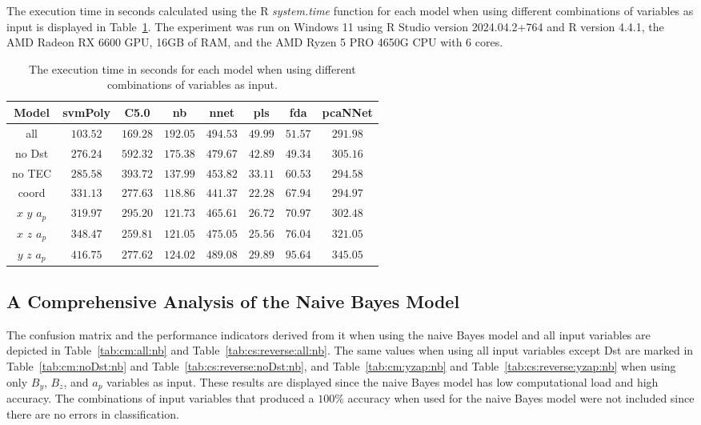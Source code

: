 \documentclass[preprint,12pt]{elsarticle}
\begin{document}
The execution time in seconds calculated using the R \textit{system.time} function \cite{rdocumentationSystemtimeFunction} for each model when using different combinations of variables as input is displayed in Table~\ref{tab:time:total}. The experiment was run on Windows 11 using R Studio version 2024.04.2+764 and R version 4.4.1, the AMD Radeon RX 6600 GPU, 16GB of RAM, and the AMD Ryzen 5 PRO 4650G CPU with 6 cores.

\begin{table}[!ht]
	\centering
	\begin{tabular}{|c|c|c|c|c|c|c|c|}
		\hline
		Model & svmPoly & C5.0 & nb & nnet & pls & fda & pcaNNet \\ \hline
		all & $103.52$ & $169.28$ & $192.05$ & $494.53$ & $49.99$ & $51.57$ & $291.98$ \\ \hline
		no Dst & $276.24$ & $592.32$ & $175.38$ & $479.67$ & $42.89$ & $49.34$ & $305.16$ \\ \hline
		no TEC & $285.58$ & $393.72$ & $137.99$ & $453.82$ & $33.11$ & $60.53$ & $294.58$ \\ \hline
		coord & $331.13$ & $277.63$ & $118.86$ & $441.37$ & $22.28$ & $67.94$ & $294.97$ \\ \hline
		$x$ $y$ $a_{p}$ & $319.97$ & $295.20$ & $121.73$ & $465.61$ & $26.72$ & $70.97$ & $302.48$ \\ \hline
		$x$ $z$ $a_{p}$ & $348.47$ & $259.81$ & $121.05$ & $475.05$ & $25.56$ & $76.04$ & $321.05$ \\ \hline
		$y$ $z$ $a_{p}$ & $416.75$ & $277.62$ & $124.02$ & $489.08$ & $29.89$ & $95.64$ & $345.05$ \\ \hline
	\end{tabular}
	\caption{The execution time in seconds for each model when using different combinations of variables as input.}
	\label{tab:time:total}
\end{table}

\subsection{A Comprehensive Analysis of the Naive Bayes Model}

The confusion matrix and the performance indicators derived from it when using the naive Bayes model and all input variables are depicted in Table~\ref{tab:cm:all:nb} and Table~\ref{tab:cs:reverse:all:nb}. The same values when using all input variables except Dst are marked in Table~\ref{tab:cm:noDst:nb} and Table~\ref{tab:cs:reverse:noDst:nb}, and Table~\ref{tab:cm:yzap:nb} and Table~\ref{tab:cs:reverse:yzap:nb} when using only $B_{y}$, $B_{z}$, and $a_{p}$ variables as input. These results are displayed since the naive Bayes model has low computational load and high accuracy. The combinations of input variables that produced a $100\%$ accuracy when used for the naive Bayes model were not included since there are no errors in classification.
\end{document}
